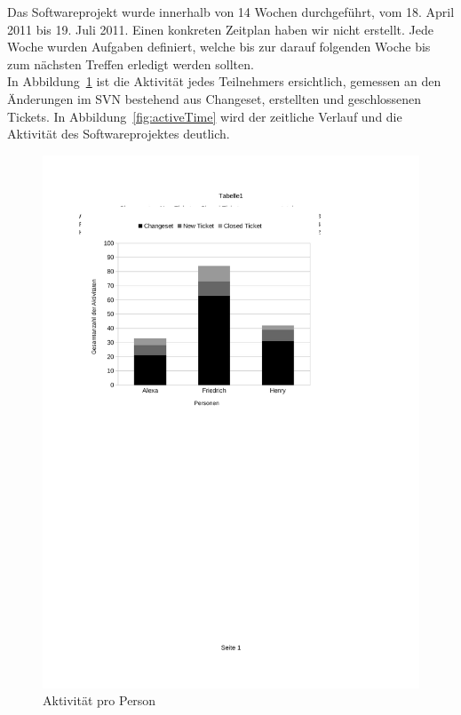 Das Softwareprojekt wurde innerhalb von 14 Wochen durchgeführt, vom 18. April 2011 bis 19. Juli 2011. Einen konkreten Zeitplan haben wir nicht erstellt. Jede Woche wurden Aufgaben definiert, welche bis zur darauf folgenden Woche \bzw bis zum nächsten Treffen erledigt werden sollten.\\

In Abbildung~\ref{fig:activePP} ist die Aktivität jedes Teilnehmers ersichtlich, gemessen an den Änderungen im SVN bestehend aus Changeset, erstellten und geschlossenen Tickets. In Abbildung~\ref{fig:activeTime} wird der zeitliche Verlauf und die Aktivität des Softwareprojektes deutlich.

\begin{figure}[htbp]
\centering
\includegraphics{03_pics/stat1.pdf}
\caption{Aktivität pro Person}
\label{fig:activePP}
\end{figure}

